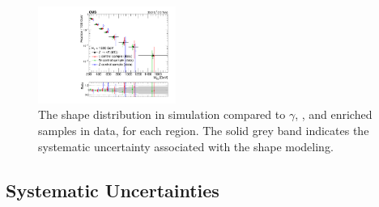 \begin{figure}
	\includegraphics[width=0.4\textwidth]{backgrounds/figs/MT2UH_W_GJ_log}
	\renewcommand{\baselinestretch}{1.0}
	\caption[The \mttwo shape distribution in \znunu simulation compared to $\gamma$, \wlnu, and \zll enriched samples in data, for each \HT region.]{The \mttwo shape distribution in \znunu simulation compared to $\gamma$, \wlnu, and \zll enriched samples in data, for each \HT region. The solid grey band indicates the systematic uncertainty associated with the \mttwo shape modeling.}
	\label{fig:zinvMt2Shape}
\end{figure}

\subsection{Systematic Uncertainties}
\label{subsec:zinvSyst}

